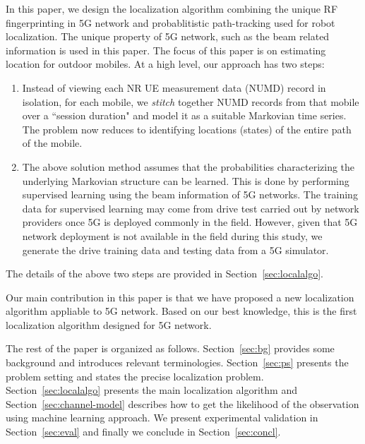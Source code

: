 \documentclass[conference, 10pt]{IEEEtran}
\begin{document}
\begin{NoHyper}

In this paper, we design the localization algorithm combining the unique RF 
fingerprinting in 5G network and probablitistic path-tracking used for robot localization. The unique property of 5G network, such as the beam related 
information is used in this paper. The focus of this paper is on estimating location for outdoor mobiles. 
At a high level, our approach has two steps:

\begin{enumerate}
    \item Instead of viewing each NR UE measurement data (NUMD) record in isolation, for each mobile, we {\em stitch}
together NUMD records from that mobile over a ``session
duration"  and model it as a suitable Markovian time series. The problem now
reduces to identifying locations (states) of the entire path of
the mobile.

\item The above solution method assumes that the probabilities characterizing the
underlying Markovian structure can be learned. This is done by performing supervised learning using the beam information of 5G networks.
The training data for supervised learning may come from
drive test carried out by network providers once 5G is deployed commonly in the field. However, given that 5G network deployment is not available in the field during this study, we generate the drive training data and testing data from a 5G simulator.
	
\end{enumerate}

The details of the above two steps are provided in Section~\ref{sec:localalgo}.


Our main contribution in this paper is that we have proposed a new localization algorithm
appliable to 5G network. Based on our best knowledge, this is the first localization algorithm designed for 5G network. 


The rest of the paper is organized as follows. Section~\ref{sec:bg} provides some
background and introduces relevant terminologies. Section~\ref{sec:ps} presents
the problem setting and states the precise localization problem.
Section~\ref{sec:localalgo}
presents the main localization algorithm and Section~\ref{sec:channel-model} describes how to get the likelihood of the observation using machine learning approach. 
We present experimental validation in Section~\ref{sec:eval} and finally we conclude in
Section~\ref{sec:concl}.


\end{NoHyper}
\end{document}
